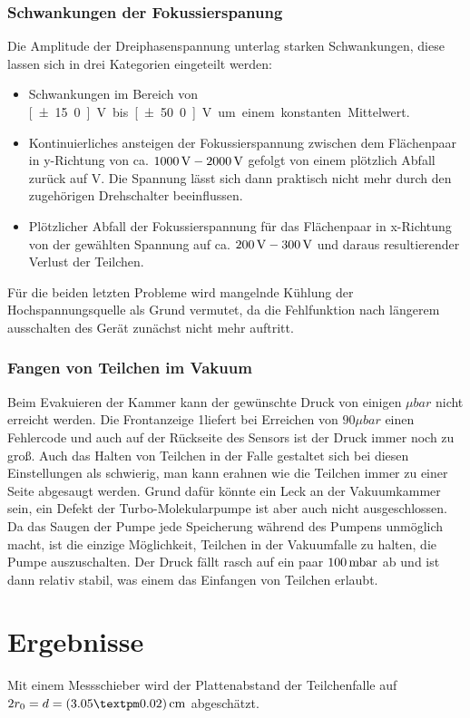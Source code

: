 \documentclass[a4paper,12pt]{article}
\begin{document}
\subsubsection*{Schwankungen der Fokussierspanung}
Die Amplitude der Dreiphasenspannung unterlag starken Schwankungen, diese lassen sich in drei Kategorien eingeteilt werden:
\begin{itemize}
\item
Schwankungen im Bereich von \unit[±15.0]{V} bis \unit[±50.0]{V} um einem konstanten Mittelwert.
\item
Kontinuierliches ansteigen der Fokussierspannung zwischen dem Flächenpaar in y-Richtung von ca. $\unit[1000]{V} - \unit[2000]{V}$ gefolgt von einem plötzlich
Abfall zurück auf \unit[1000]{V}. Die Spannung lässt sich dann praktisch nicht mehr durch den zugehörigen Drehschalter beeinflussen.
\item
Plötzlicher Abfall der Fokussierspannung für das Flächenpaar in x-Richtung von der gewählten Spannung auf ca. $\unit[200]{V} - \unit[300]{V}$ und daraus resultierender
Verlust der Teilchen.
\end{itemize}
Für die beiden letzten Probleme wird mangelnde Kühlung der Hochspannungsquelle als Grund vermutet, da die Fehlfunktion nach längerem ausschalten des Gerät zunächst nicht mehr auftritt.

\subsubsection*{Fangen von Teilchen im Vakuum}
Beim Evakuieren der Kammer kann der gewünschte Druck von einigen $\unit{μbar}$ nicht erreicht werden.
Die Frontanzeige 1liefert bei Erreichen von $90μbar$ einen Fehlercode und auch auf der Rückseite des Sensors ist der Druck immer noch zu groß.
Auch das Halten von Teilchen in der Falle gestaltet sich bei diesen Einstellungen als schwierig, man kann erahnen wie die Teilchen immer zu einer Seite abgesaugt werden.
Grund dafür könnte ein Leck an der Vakuumkammer sein, ein Defekt der Turbo-Molekularpumpe ist aber auch nicht ausgeschlossen.
Da das Saugen der Pumpe jede Speicherung während des Pumpens unmöglich macht, ist die einzige Möglichkeit, Teilchen in der Vakuumfalle zu halten, die Pumpe auszuschalten.
Der Druck fällt rasch auf ein paar $\unit[100] {mbar}$ ab und ist dann relativ stabil, was einem das Einfangen von Teilchen erlaubt.

\section{Ergebnisse}
Mit einem Messschieber wird der Plattenabstand der Teilchenfalle auf $2r_0 = d = \unit[(3.05±0.02)]{cm}$ abgeschätzt.
\end{document}
